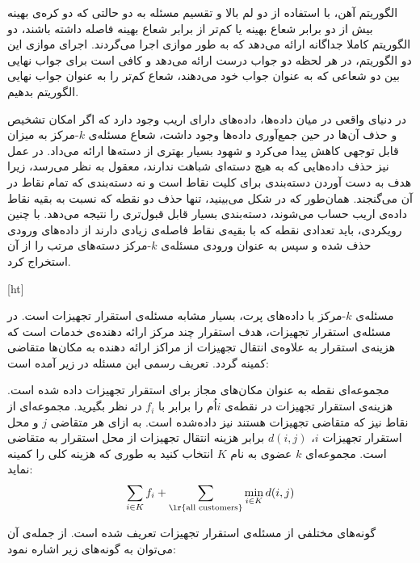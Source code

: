 
الگوریتم آهن، با استفاده از دو لم بالا و تقسیم مسئله به دو حالتی که دو کره‌ی بهینه بیش از دو برابر شعاع بهینه یا کم‌تر از برابر شعاع بهینه فاصله داشته باشند، دو الگوریتم کاملا جداگانه ارائه می‌دهد که به طور موازی اجرا می‌گردند. اجرای موازی این دو الگوریتم، در هر لحظه دو جواب درست ارائه می‌دهد و کافی است برای جواب نهایی بین دو شعاعی که به عنوان جواب خود می‌دهند، شعاع کم‌تر را به عنوان جواب نهایی الگوریتم بدهیم.


در دنیای واقعی در میان داده‌ها، داده‌های دارای اریب‌ وجود دارد که اگر امکان تشخیص و حذف آن‌ها در حین جمع‌آوری داده‌ها وجود داشت، شعاع مسئله‌ی $k$-مرکز به میزان قابل توجهی کاهش پیدا می‌کرد و شهود بسیار بهتری از دسته‌ها ارائه می‌داد. در عمل نیز حذف داده‌هایی که به هیچ دسته‌ای شباهت ندارند، معقول به نظر می‌رسد، زیرا هدف به دست آوردن دسته‌بندی برای کلیت نقاط است و نه دسته‌بندی که تمام نقاط در آن می‌گنجند. همان‌طور که در شکل  می‌بینید، تنها حذف دو نقطه که نسبت به بقیه نقاط داده‌ی اریب حساب می‌شوند، دسته‌بندی بسیار قابل قبول‌تری  را نتیجه می‌دهد. با چنین رویکردی، باید تعدادی نقطه که با بقیه‌ی نقاط فاصله‌ی زیادی دارند از داده‌های ورودی حذف شده و سپس به عنوان ورودی مسئله‌ی $k$-مرکز دسته‌های مرتب را از آن استخراج کرد. 

[ht]

مسئله‌ی $k$-مرکز با داده‌های پرت، بسیار مشابه مسئله‌ی استقرار تجهیزات است. در  مسئله‌ی استقرار تجهیزات، هدف استقرار چند مرکز ارائه دهنده‌ی خدمات است که هزینه‌ی استقرار به علاوه‌ی انتقال تجهیزات از‌ مراکز  ارائه دهنده به مکان‌ها متقاضی کمینه گردد. تعریف رسمی این مسئله در زیر آمده است:

مجموعه‌ای نقطه به عنوان مکان‌های مجاز برای استقرار تجهیزات داده شده است. هزینه‌ی استقرار تجهیزات در نقطه‌ی $i$اُم را برابر با $f_i$ در نظر بگیرید. مجموعه‌ای از نقاط نیز که متقاضی تجهیزات هستند نیز داده‌شده است. به ازای هر متقاضی $j$ و محل استقرار تجهیزات $i$، $d(i, j)$ برابر هزینه انتقال تجهیزات از محل استقرار به متقاضی است. مجموعه‌ای $k$ عضوی به نام $K$ انتخاب کنید به طوری که هزینه کلی را کمینه نماید:
$$\sum_{i \in K} f_i + \sum_{\lr{\text{all customers}}}{\min_{i \in K} d(i, j)}$$


 گونه‌های مختلفی از مسئله‌ی استقرار تجهیزات تعریف شده است. از جمله‌ی آن می‌توان به گونه‌های زیر اشاره نمود:

